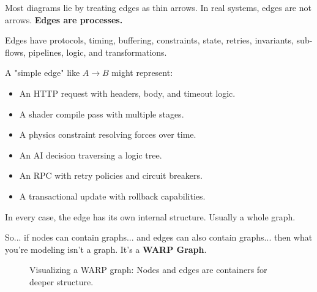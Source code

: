 Most diagrams lie by treating edges as thin arrows. In real systems, edges are not arrows. \textbf{Edges are processes.}

Edges have protocols, timing, buffering, constraints, state, retries, invariants, sub-flows, pipelines, logic, and transformations.

A "simple edge" like $A \rightarrow B$ might represent:
\begin{itemize}
    \item An HTTP request with headers, body, and timeout logic.
    \item A shader compile pass with multiple stages.
    \item A physics constraint resolving forces over time.
    \item An AI decision traversing a logic tree.
    \item An RPC with retry policies and circuit breakers.
    \item A transactional update with rollback capabilities.
\end{itemize}

In every case, the edge has its own internal structure. Usually a whole graph.

So... if nodes can contain graphs... and edges can also contain graphs... then what you're modeling isn't a graph. It's a \textbf{WARP Graph}.

\begin{figure}[h]
    \centering
\caption{Visualizing a WARP graph: Nodes and edges are containers for deeper structure.}
    \label{fig:rmg_concept}
\end{figure}

